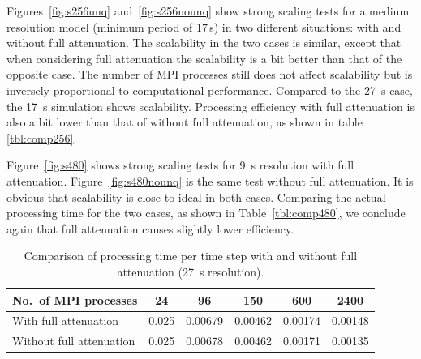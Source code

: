 Figures~\ref{fig:s256unq} and~\ref{fig:s256nounq} show strong scaling tests
for a medium resolution model (minimum period of 17\,s)
in two different situations: with and without full attenuation. The
scalability in the two cases is similar, except that
when considering full attenuation the scalability is a bit better than that of the
opposite case. The number of MPI processes still does not affect scalability
 but is inversely proportional to computational performance.
Compared to the 27~s case, the
17~s simulation shows scalability. Processing efficiency with
full attenuation is also a bit lower than that of without full attenuation, as
shown in table \ref{tbl:comp256}.

Figure~\ref{fig:s480} shows strong scaling tests for 9~s resolution with
full attenuation. Figure~\ref{fig:s480nounq} is the same test without
full attenuation. It is obvious that scalability is close to ideal in
both cases. Comparing the actual processing time for the two cases, as shown in
Table~\ref{tbl:comp480}, we conclude again that full attenuation
causes slightly lower efficiency.

\begin{table}[]
\centering
  \caption[Processing time with and without full attenuation at 27~s resolution]
  {\small{Comparison of processing time per time step with and without full 
    attenuation (27~s resolution).}}
\label{tbl:comp160}
    \begin{tabular}{lccccc}
	  No.\ of MPI processes & 24 & 96 & 150 & 600   &  2400			       		 \\
    \midrule
	  With full attenuation & 0.025 & 0.00679 & 0.00462 & 0.00174 &0.00148 \\
    Without full attenuation & 0.025 & 0.00678 &0.00462 &0.00171 & 0.00135		       		 \\
    \end{tabular}
 \end{table}

